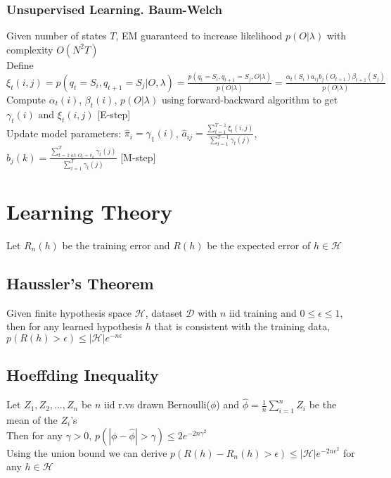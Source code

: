 \documentclass{article}
\renewcommand{\P}{p}
\renewcommand{\H}{\mathcal{H}}
\newcommand{\D}{\mathcal{D}}
\begin{document}
\subsubsection{Unsupervised Learning. Baum-Welch}
Given number of states $T$, EM guaranteed to increase likelihood $p(O| \lambda)$ with complexity $O(N^2T)$ \\
Define $\xi_t(i,j) = \P(q_t = S_i, q_{t+1} = S_j | O, \lambda) = \frac{\P(q_t = S_i, q_{t+1} = S_j, O | \lambda)}{\P(O | \lambda)} = \frac{\alpha_t(S_i)a_{ij}b_j(O_{t+1})\beta_{t+1}(S_j)}{\P(O | \lambda)}$ \\
Compute $\alpha_t(i)$, $\beta_t(i)$, $\P(O| \lambda)$ using forward-backward algorithm to get $\gamma_t(i)$ and $\xi_t(i,j)$ [E-step] \\
Update model parameters: $\hat{\pi}_i = \gamma_1(i)$, $\hat{a}_{ij} = \frac{\sum_{t=1}^{T-1}\xi_t(i,j)}{\sum_{t=1}^{T-1}\gamma_t(j)}$, $\hat{b}_j(k) = \frac{\sum_{t=1 \text{ s.t } O_t = v_k}^{T} \gamma_t(j)}{\sum_{t=1}^{T}\gamma_t(j)}$ [M-step] 

\section{Learning Theory}
Let $R_n(h)$ be the training error and $R(h)$ be the expected error of $h \in \H$ 

\subsection{Haussler's Theorem}
Given finite hypothesis space $\H$, dataset $\D$ with $n$ iid training and $0 \leq \epsilon \leq 1$, then for any learned hypothesis $h$ that is consistent with the training data, $\P(R(h) > \epsilon) \leq |\H| e ^{-n\epsilon}$

\subsection{Hoeffding Inequality}
Let $Z_1, Z_2, ..., Z_n$ be $n$ iid r.vs drawn Bernoulli($\phi$) and $\hat{\phi} = \frac{1}{n}\sum_{i=1}^n Z_i$ be the mean of the $Z_i$'s \\ Then for any $\gamma > 0$, $\P(|\phi - \hat{\phi}| > \gamma) \leq 2e^{-2n\gamma^2}$ \\
Using the union bound we can derive $\P(R(h) - R_n(h) > \epsilon) \leq |\H| e^{-2n\epsilon^2}$ for any $h \in \H$
\end{document}
